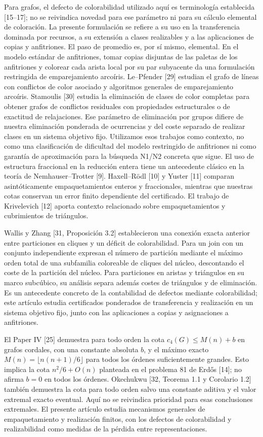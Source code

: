 \documentclass[spanish,11pt,a4paper]{article}
\begin{document}
Para grafos, el defecto de colorabilidad utilizado aquí es terminología
establecida {[}15--17{]}; no se reivindica novedad para ese parámetro ni
para su cálculo elemental de coloración. La presente formulación se
refiere a su uso en la transferencia dominada por recursos, a su
extensión a clases realizables y a las aplicaciones de copias y
anfitriones. El paso de promedio es, por sí mismo, elemental. En el
modelo estándar de anfitriones, tomar copias disjuntas de las paletas de
los anfitriones y colorear cada arista local por su par subyacente da
una formulación restringida de emparejamiento arcoíris. Le--Pfender
{[}29{]} estudian el grafo de líneas con conflictos de color asociado y
algoritmos generales de emparejamiento arcoíris. Stamoulis {[}30{]}
estudia la eliminación de clases de color completas para obtener grafos
de conflictos residuales con propiedades estructurales o de exactitud de
relajaciones. Ese parámetro de eliminación por grupos difiere de nuestra
eliminación ponderada de ocurrencias y del coste separado de realizar
clases en un sistema objetivo fijo. Utilizamos esos trabajos como
contexto, no como una clasificación de dificultad del modelo restringido
de anfitriones ni como garantía de aproximación para la búsqueda N1/N2
concreta que sigue. El uso de estructura fraccional en la reducción
entera tiene un antecedente clásico en la teoría de Nemhauser--Trotter
{[}9{]}. Haxell--Rödl {[}10{]} y Yuster {[}11{]} comparan
asintóticamente empaquetamientos enteros y fraccionales, mientras que
nuestras cotas conservan un error finito dependiente del certificado. El
trabajo de Krivelevich {[}12{]} aporta contexto relacionado sobre
empaquetamientos y cubrimientos de triángulos.

Wallis y Zhang {[}31, Proposición 3.2{]} establecieron una conexión
exacta anterior entre particiones en cliques y un déficit de
colorabilidad. Para un join con un conjunto independiente expresan el
número de partición mediante el máximo orden total de una subfamilia
coloreable de cliques del núcleo, descontando el coste de la partición
del núcleo. Para particiones en aristas y triángulos en su marco
subcúbico, su análisis separa además costes de triángulos y de
eliminación. Es un antecedente concreto de la contabilidad de defectos
mediante colorabilidad; este artículo estudia certificados ponderados de
transferencia y realización en un sistema objetivo fijo, junto con las
aplicaciones a copias y asignaciones a anfitriones.

El Paper IV {[}25{]} demuestra para todo orden la cota
\(c_4(G)\le M(n)+b\) en grafos cordales, con una constante absoluta
\(b\), y el máximo exacto \(M(n)=\lfloor n(n+1)/6\rfloor\) para todos
los órdenes suficientemente grandes. Esto implica la cota \(n^2/6+O(n)\)
planteada en el problema 81 de Erdős {[}14{]}; no afirma \(b=0\) en
todos los órdenes. Okechukwu {[}32, Teorema 1.1 y Corolario 1.2{]}
también demuestra la cota para todo orden salvo una constante aditiva y
el valor extremal exacto eventual. Aquí no se reivindica prioridad para
esas conclusiones extremales. El presente artículo estudia mecanismos
generales de empaquetamiento y realización finitos, con los defectos de
colorabilidad y realizabilidad como medidas de la pérdida entre
representaciones.
\end{document}
